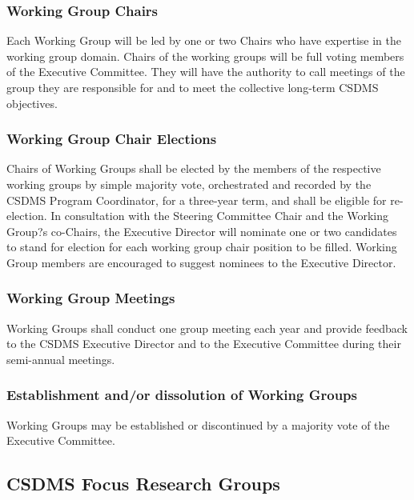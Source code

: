\documentclass[11pt, oneside]{article}   	%
\begin{document}
\subsubsection{Working Group Chairs}

Each Working Group will be led by one or two Chairs who have expertise in the working group domain. Chairs of the working groups will be full voting members of the Executive Committee. They will have the authority to call meetings of the group they are responsible for and to meet the collective long-term CSDMS objectives.  

\subsubsection{Working Group Chair Elections}

Chairs of Working Groups shall be elected by the members of the respective working groups by simple majority vote, orchestrated and recorded by the CSDMS Program Coordinator, for a three-year term, and shall be eligible for re-election. In consultation with the Steering Committee Chair and the Working Group?s co-Chairs, the Executive Director will nominate one or two candidates to stand for election for each working group chair position to be filled. Working Group members are encouraged to suggest nominees to the Executive Director. 

\subsubsection{	Working Group Meetings}

Working Groups shall conduct one group meeting each year and provide feedback to the CSDMS Executive Director and to the Executive Committee during their semi-annual meetings.

\subsubsection{	Establishment and/or dissolution of Working Groups}

Working Groups may be established or discontinued by a majority vote of the Executive Committee. 


\subsection{CSDMS Focus Research Groups}
\end{document}
